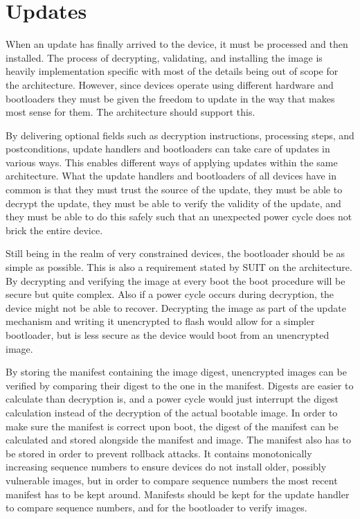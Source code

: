 \documentclass[0-thesis.tex]{subfiles}
\begin{document}
\section{Updates}
\label{sec:updates}

When an update has finally arrived to the device, it must be processed and then installed.
The process of decrypting, validating, and installing the image is heavily implementation
specific with most of the details being out of scope for the architecture. However, since
devices operate using different hardware and bootloaders they must be given the freedom
to update in the way that makes most sense for them. The architecture should support this.

By delivering optional fields such as decryption instructions, processing steps, and
postconditions, update handlers and bootloaders can take care of updates in various ways.
This enables different ways of applying updates within the same architecture. What the
update handlers and bootloaders of all devices have in common is that they must trust the
source of the update, they must be able to decrypt the update, they must be able to verify
the validity of the update, and they must be able to do this safely such that an
unexpected power cycle does not brick the entire device.

Still being in the realm of very constrained devices, the bootloader should be as simple
as possible. This is also a requirement stated by SUIT on the architecture. By decrypting
and verifying the image at every boot the boot procedure will be secure but
quite complex. Also if a power cycle occurs during decryption, the device might not be
able to recover. Decrypting the image as part of the update mechanism and writing it
unencrypted to flash would allow for a simpler bootloader, but is less secure as the
device would boot from an unencrypted image.

By storing the manifest containing the image digest, unencrypted images can be verified by
comparing their digest to the one in the manifest. Digests are easier to calculate than
decryption is, and a power cycle would just interrupt the digest calculation instead of
the decryption of the actual bootable image. In order to make sure the manifest is correct
upon boot, the digest of the manifest can be calculated and stored alongside the manifest
and image. The manifest also has to be stored in order to prevent rollback attacks. It
contains monotonically increasing sequence numbers to ensure devices do not install older,
possibly vulnerable images, but in order to compare sequence numbers the most recent
manifest has to be kept around. Manifests should be kept for the update handler to compare
sequence numbers, and for the bootloader to verify images.
\end{document}
